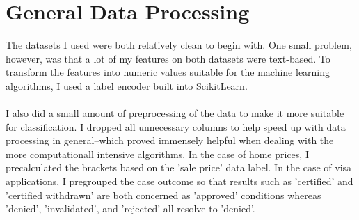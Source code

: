 \documentclass[h]{article}
\begin{document}
  \section*{General Data Processing}
  The datasets I used were both relatively clean to begin with.  One small 
  problem, however, was that a lot of my features on both datasets were 
  text-based.  To transform the features into numeric values suitable for the 
  machine learning algorithms, I used a label encoder built into ScikitLearn.
  \\ \\
  I also did a small amount of preprocessing of the data to make it more 
  suitable for classification.  I dropped all unnecessary columns to help 
  speed up with data processing in general--which proved immensely helpful when 
  dealing with the more computationall intensive algorithms.  In the 
  case of home prices, I precalculated the brackets based on the 'sale price' data label.  
  In the case of visa applications, I pregrouped the case outcome so that 
  results such as 'certified' and 'certified withdrawn' are both concerned as 
  'approved' conditions whereas 'denied', 'invalidated', and 'rejected' all 
  resolve to 'denied'.
  
\end{document}
